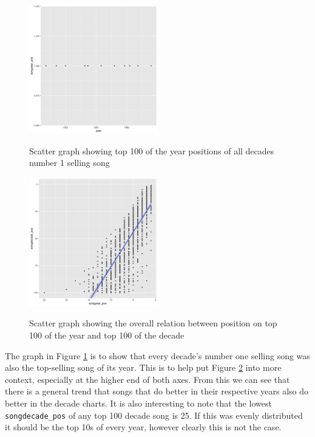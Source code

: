 \documentclass[12pt]{article}
\newcommand{\myfig}{\begin{figure}}
\begin{document}
        \myfig
          \caption{Scatter graph showing top 100 of the year positions of all decades number 1 selling song}
          \includegraphics[width=0.5\textwidth]{topSell}
          \label{fig:q4p1}
        \end{figure}

        \myfig
          \caption{Scatter graph showing the overall relation between position on top 100 of the year and top 100 of the decade}
          \includegraphics[width=0.5\textwidth]{yearDecade}
          \label{fig:q4p2}
        \end{figure}

        The graph in Figure \ref{fig:q4p1} is to show that every decade's number one selling song was also the top-selling song of its year.
        This is to help put Figure \ref{fig:q4p2} into more context, especially at the higher end of both axes.
        From this we can see that there is a general trend that songs that do better in their respective years also do better in the decade charts.
        It is also interesting to note that the lowest \verb|songdecade_pos| of any top 100 decade song is 25.
        If this was evenly distributed it should be the top 10s of every year, however clearly this is not the case.
\end{document}
